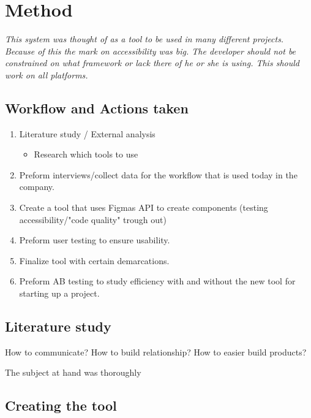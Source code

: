 \section{Method}

\textit{
This system was thought of as a tool to be used in many different projects. Because of this the mark on accessibility was big. The developer should not be constrained on what framework or lack there of he or she is using. This should work on all platforms.
}


\subsection{Workflow and Actions taken}%
\label{sub:workflow}

\begin{enumerate}
  \item Literature study / External analysis
    \begin{itemize}
      \item Research which tools to use
    \end{itemize}
  \item Preform interviews/collect data for the workflow that is used today in the company.
  \item Create a tool that uses Figmas API to create components (testing accessibility/"code quality" trough out)
  \item Preform user testing to ensure usability. 
  \item Finalize tool with certain demarcations.
  \item Preform AB testing to study efficiency with and without the new tool for starting up a project.
\end{enumerate}

\subsection{Literature study}%
\label{sub:Literature study}
How to communicate? 
How to build relationship? 
How to easier build products?

The subject at hand was thoroughly 


\subsection{Creating the tool}%
\label{sub:}


